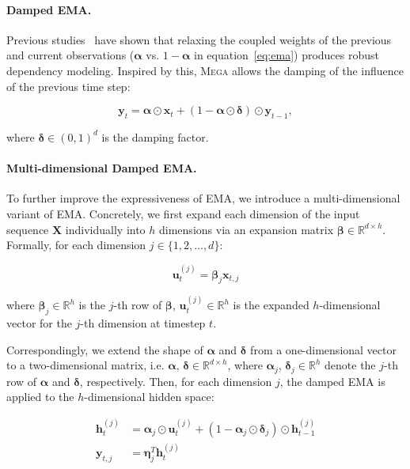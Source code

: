 \paragraph{Damped EMA.} Previous studies~\citep{mckenzie2010damped,svetunkov2016complex} have shown that relaxing the coupled weights of the previous and current observations  ($\boldsymbol{\alpha}$ vs. $1 - \boldsymbol{\alpha}$ in equation~\ref{eq:ema}) produces robust dependency modeling. Inspired by this, \textsc{Mega} allows the damping of the influence of the previous time step:

\begin{equation}
\label{eq:damping}
\mathbf{y}_t = \boldsymbol{\alpha} \odot \mathbf{x}_t + (1 - \boldsymbol{\alpha} \odot \boldsymbol{\delta}) \odot \mathbf{y}_{t-1},
\end{equation}

where $\boldsymbol{\delta} \in (0, 1)^{d}$ is the damping factor. 

\paragraph{Multi-dimensional Damped EMA.} To further improve the expressiveness of EMA, we introduce a multi-dimensional variant of  EMA. Concretely, we first expand each dimension of the input sequence $\boldsymbol{X}$ individually into $h$ dimensions via an expansion matrix $\boldsymbol{\beta} \in \mathbb{R}^{d\times h}$. Formally, for each dimension $j \in \{1, 2, \ldots, d\}$:

\begin{equation}
\mathbf{u}^{(j)}_t = \boldsymbol{\beta}_j \mathbf{x}_{t,j}
\end{equation}

where $\boldsymbol{\beta}_j \in \mathbb{R}^{h}$ is the $j$-th row of $\boldsymbol{\beta}$,  $\mathbf{u}^{(j)}_t \in \mathbb{R}^{h}$ is the expanded $h$-dimensional vector for the $j$-th dimension at timestep $t$. 

Correspondingly, we extend the shape of $\boldsymbol{\alpha}$ and $\boldsymbol{\delta}$ from a one-dimensional vector to a two-dimensional matrix, i.e. $\boldsymbol{\alpha}$, $\boldsymbol{\delta} \in \mathbb{R}^{d\times h}$, where $\boldsymbol{\alpha}_j$, $\boldsymbol{\delta}_j \in \mathbb{R}^{h}$ denote the $j$-th row of $\boldsymbol{\alpha}$ and $\boldsymbol{\delta}$, respectively. Then, for each dimension $j$, the damped EMA is applied to the $h$-dimensional hidden space:

\begin{align}
\label{eq:mddema}
\mathbf{h}^{(j)}_t & = \boldsymbol{\alpha}_j \odot \mathbf{u}^{(j)}_t + (1 - \boldsymbol{\alpha}_j \odot \boldsymbol{\delta}_j) \odot \mathbf{h}^{(j)}_{t-1} \nonumber \\
\mathbf{y}_{t,j} & = \boldsymbol{\eta}^T_j \mathbf{h}^{(j)}_t
\end{align}

